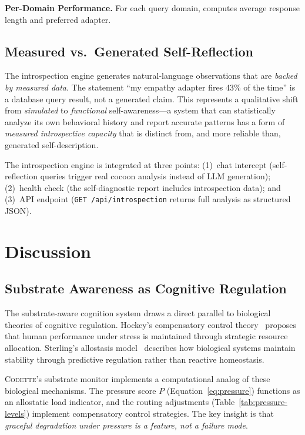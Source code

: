 \documentclass[11pt,a4paper]{article}
\newcommand{\codette}{\textsc{Codette}}
\begin{document}
\textbf{Per-Domain Performance.} For each query domain, computes average
response length and preferred adapter.

\subsection{Measured vs.\ Generated Self-Reflection}

The introspection engine generates natural-language observations that are
\emph{backed by measured data}. The statement ``my empathy adapter fires 43\%
of the time'' is a database query result, not a generated claim. This
represents a qualitative shift from \emph{simulated} to \emph{functional}
self-awareness---a system that can statistically analyze its own behavioral
history and report accurate patterns has a form of \emph{measured introspective
capacity} that is distinct from, and more reliable than, generated
self-description.

The introspection engine is integrated at three points:
(1)~chat intercept (self-reflection queries trigger real cocoon analysis
instead of LLM generation);
(2)~health check (the self-diagnostic report includes introspection data); and
(3)~API endpoint (\texttt{GET /api/introspection} returns full analysis as
structured JSON).

\section{Discussion}
\label{sec:discussion}

\subsection{Substrate Awareness as Cognitive Regulation}

The substrate-aware cognition system draws a direct parallel to biological
theories of cognitive regulation. Hockey's compensatory control
theory~\citep{hockey1997compensatory} proposes that human performance under
stress is maintained through strategic resource allocation. Sterling's
allostasis model~\citep{sterling2012allostasis} describes how biological
systems maintain stability through predictive regulation rather than reactive
homeostasis.

\codette{}'s substrate monitor implements a computational analog of these
biological mechanisms. The pressure score $P$ (Equation~\ref{eq:pressure})
functions as an allostatic load indicator, and the routing adjustments
(Table~\ref{tab:pressure-levels}) implement compensatory control strategies.
The key insight is that \emph{graceful degradation under pressure is a
feature, not a failure mode}.
\end{document}
